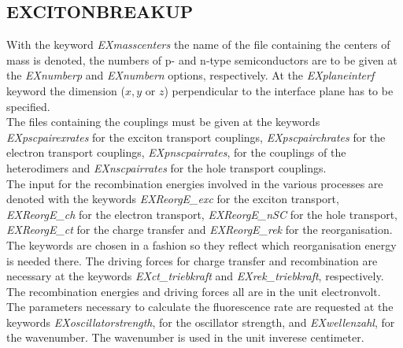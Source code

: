 \documentclass[10pt,a4paper]{article} %
\begin{document}
	\subsection{EXCITONBREAKUP}
With the keyword \textit{EXmasscenters} the name of the file containing the centers of mass is denoted, the numbers of p- and n-type semiconductors are to be given at the \textit{EXnumberp} and \textit{EXnumbern} options, respectively. At the \textit{EXplaneinterf} keyword the dimension ($x, y$ or $z$) perpendicular to the interface plane has to be specified. \\
The files containing the couplings must be given at the keywords \textit{EXpscpairexrates} for the exciton transport couplings, \textit{EXpscpairchrates} for the electron transport couplings, \textit{EXpnscpairrates}, for the couplings of the heterodimers and \textit{EXnscpairrates} for the hole transport couplings.\\
The input for the recombination energies involved in the various processes are denoted with the keywords \textit{EXReorgE\_exc} for the exciton transport, \textit{EXReorgE\_ch} for the electron transport, \textit{EXReorgE\_nSC} for the hole transport, \textit{EXReorgE\_ct} for the charge transfer and \textit{EXReorgE\_rek} for the reorganisation. The keywords are chosen in a fashion so they reflect which reorganisation energy is needed there. The driving forces for charge transfer and recombination are necessary at the keywords \textit{EXct\_triebkraft} and \textit{EXrek\_triebkraft}, respectively. The recombination energies and driving forces all are in the unit electronvolt. The parameters necessary to calculate the fluorescence rate are requested at the keywords \textit{EXoscillatorstrength}, for the oscillator strength, and \textit{EXwellenzahl}, for the wavenumber. The wavenumber is used in the unit inverese centimeter.
\end{document}
